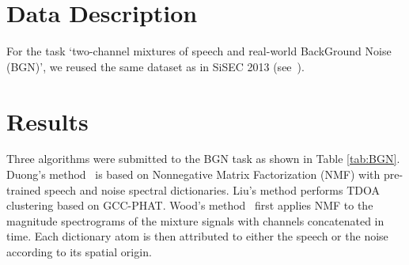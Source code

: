 \documentclass{article}
\begin{document}
\section{Data Description}
For the task `two-channel mixtures of speech and real-world BackGround Noise (BGN)',
we reused the same dataset as in SiSEC 2013 (see~\cite{SiSEC2013}).


\section{Results}
Three algorithms were submitted to the BGN task as shown in Table \ref{tab:BGN}. 
Duong's method~\cite{Duong2015} is based on Nonnegative Matrix Factorization (NMF) with pre-trained speech and noise spectral dictionaries.
Liu's method performs TDOA clustering based on GCC-PHAT.
Wood's method~\cite{Wood2016} first applies NMF to the magnitude spectrograms of the mixture signals with channels concatenated in time. Each dictionary atom  is then attributed to either the speech or the noise according to its spatial origin.
\end{document}
